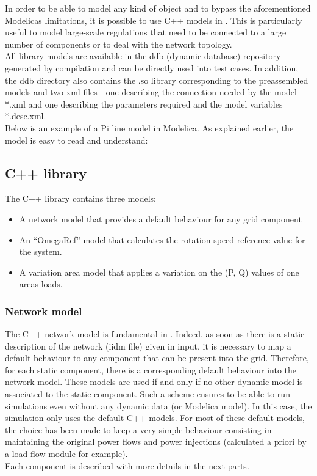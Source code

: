 \documentclass[a4paper, 12pt]{report}
\begin{document}
In order to be able to model any kind of object and to bypass the aforementioned Modelica\textquotesingle s limitations, it is possible to use C++ models in \Dynawo. This is particularly useful to model large-scale regulations that need to be connected to a large number of components or to deal with the network topology. \\

All library models are available in the ddb (dynamic database) repository generated by \Dynawo compilation and can be directly used into test cases. In addition, the ddb directory also contains the .so library corresponding to the preassembled models and two xml files - one describing the connection needed by the model *.xml and one describing the parameters required and the model variables *.desc.xml.  \\

Below is an example of a Pi line model in Modelica. As explained earlier, the model is easy to read and understand:



\subsection{C++ library}

The C++ library contains three models:
\begin{itemize}
\item A network model that provides a default behaviour for any grid component
\item An ``OmegaRef'' model that calculates the rotation speed reference value for the system.
\item A variation area model that applies a variation on the (P, Q) values of one area\textquotesingle s loads.
\end{itemize}

\subsubsection{Network model}

The C++ network model is fundamental in \Dynawo. Indeed, as soon as there is a static description of the network (iidm file) given in input, it is necessary to map a default behaviour to any component that can be present into the grid. Therefore, for each static component, there is a corresponding default behaviour into the network model. These models are used if and only if no other dynamic model is associated to the static component. Such a scheme ensures to be able to run simulations even without any dynamic data (or Modelica model). In this case, the simulation only uses the default C++ models. For most of these default models, the choice has been made to keep a very simple behaviour consisting in maintaining the original power flows and power injections (calculated a priori by a load flow module for example). \\
Each component is described with more details in the next parts. \\
\end{document}
